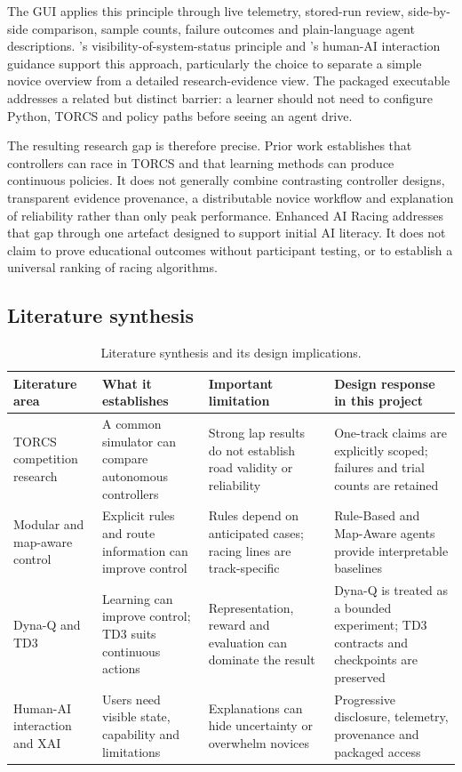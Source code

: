 The GUI applies this principle through live telemetry, stored-run review, side-by-side comparison, sample counts, failure outcomes and plain-language agent descriptions. \textcite{nielsen1994}'s visibility-of-system-status principle and \textcite{amershi2019}'s human-AI interaction guidance support this approach, particularly the choice to separate a simple novice overview from a detailed research-evidence view. The packaged executable addresses a related but distinct barrier: a learner should not need to configure Python, TORCS and policy paths before seeing an agent drive.

The resulting research gap is therefore precise. Prior work establishes that controllers can race in TORCS and that learning methods can produce continuous policies. It does not generally combine contrasting controller designs, transparent evidence provenance, a distributable novice workflow and explanation of reliability rather than only peak performance. Enhanced AI Racing addresses that gap through one artefact designed to support initial AI literacy. It does not claim to prove educational outcomes without participant testing, or to establish a universal ranking of racing algorithms.

\subsection{Literature synthesis}

\begin{table}[htbp]
  \centering
  \caption{Literature synthesis and its design implications.}
  \label{tab:literature-synthesis}
  \small
  \begin{tabularx}{\textwidth}{p{}YYY}
    \toprule
    Literature area & What it establishes & Important limitation & Design response in this project \\
    \midrule
    TORCS competition research & A common simulator can compare autonomous controllers & Strong lap results do not establish road validity or reliability & One-track claims are explicitly scoped; failures and trial counts are retained \\
    Modular and map-aware control & Explicit rules and route information can improve control & Rules depend on anticipated cases; racing lines are track-specific & Rule-Based and Map-Aware agents provide interpretable baselines \\
    Dyna-Q and TD3 & Learning can improve control; TD3 suits continuous actions & Representation, reward and evaluation can dominate the result & Dyna-Q is treated as a bounded experiment; TD3 contracts and checkpoints are preserved \\
    Human-AI interaction and XAI & Users need visible state, capability and limitations & Explanations can hide uncertainty or overwhelm novices & Progressive disclosure, telemetry, provenance and packaged access \\
    \bottomrule
  \end{tabularx}
\end{table}



